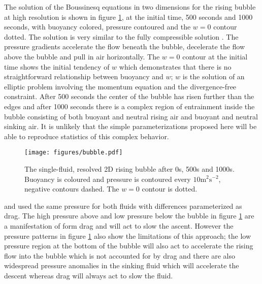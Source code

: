 \documentclass[draft]{agujournal2019}
\begin{document}
The solution of the Boussinesq equations in two dimensions for the rising bubble at high resolution is shown in figure \ref{fig:bubble}, at the initial time, 500 seconds and 1000 seconds,
with buoyancy colored, pressure contoured and the $w=0$ contour dotted.
The solution is very similar to the fully compressible solution \cite{BF02}.
The pressure gradients accelerate the flow beneath the bubble, decelerate
the flow above the bubble and pull in air horizontally. 
The $w=0$ contour at the initial time shows the initial tendency of $w$ which demonstrates that there is no straightforward relationship between buoyancy and $w$; $w$ is the solution of an elliptic problem involving the momentum equation and the divergence-free constraint. After 500 seconds the center of the bubble has risen further than the edges and after 1000 seconds there is a complex region of entrainment inside the bubble consisting of both buoyant and neutral rising air and buoyant and neutral sinking air. It is unlikely that the simple parameterizations proposed here will be able to reproduce statistics of this complex behavior.

\begin{figure}
\noindent \begin{centering}
\texttt{[image: figures/bubble.pdf]}
\par\end{centering}
\caption{\label{fig:bubble}The single-fluid, resolved 2D rising bubble after 0s, 500s and 1000s. Buoyancy is coloured and pressure is contoured every $10\text{m}^{2}\text{s}^{-2}$,
negative contours dashed. The $w=0$ contour is dotted.
}
\end{figure}

 and 
used the same pressure
for both fluids with differences parameterized as drag. 
The high pressure above and low pressure below the bubble in figure {\protect\ref{fig:bubble}} are a manifestation of form drag and will act to slow the ascent. However the pressure patterns in figure {\protect\ref{fig:bubble}} also show the limitations of this approach; the low pressure region at the bottom of the bubble will also act to accelerate the rising flow into the bubble which is not accounted for by drag and there are also widespread pressure anomalies in the sinking fluid which will accelerate the descent whereas drag will always act to slow the fluid.
\end{document}
